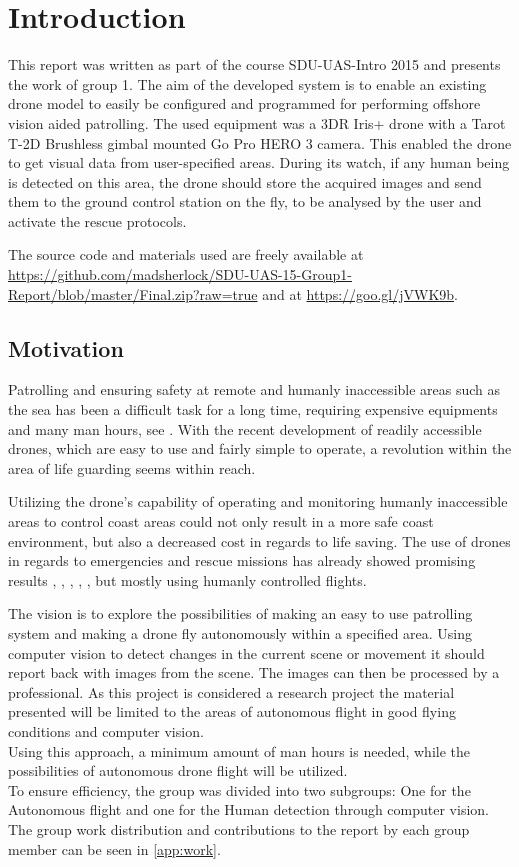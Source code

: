 \chapter*{Introduction}
This report was written as part of the course SDU-UAS-Intro 2015 and presents the work of group 1. 
The aim of the developed system is to enable an existing drone model to easily be configured and
programmed for performing offshore vision aided patrolling. 
The used equipment was a 3DR Iris+ drone with a Tarot T-2D Brushless gimbal mounted Go Pro HERO 3 camera.
This enabled the drone to get visual data from %
user-specified areas. %
During its watch, if any human being is detected on this area, the drone should store the acquired images and send
them to the ground control station on the fly, to be analysed by the user and activate the rescue protocols.

The source code and materials used are freely available at
\url{https://github.com/madsherlock/SDU-UAS-15-Group1-Report/blob/master/Final.zip?raw=true}
and at \url{https://goo.gl/jVWK9b}.

\section*{Motivation}
Patrolling and ensuring safety at remote and humanly inaccessible areas such as the sea has 
been a difficult task for a long time, requiring expensive equipments and many man hours,
see \cite{Ref:Drone2}.
With the recent development of readily accessible drones, which are easy to use and fairly simple to operate,
a revolution within the area of life guarding seems within reach. 

Utilizing the drone's capability of operating and monitoring humanly inaccessible areas to control coast areas
could not only result in a more safe coast environment, but also a decreased cost in regards to life saving.
The use of drones in regards to emergencies and rescue missions has already showed promising results
\cite{Ref:Drone1}, \cite{Ref:Drone3}, \cite{Ref:Drone4}, \cite{Ref:DroneResearch1}, \cite{Ref:DroneResearch1},
but mostly using humanly controlled flights.

The vision is to explore the possibilities of making an easy to use patrolling system
and making a drone fly autonomously within a specified area.
Using computer vision to detect changes in the current scene or movement it should report back with images from the scene.
The images can then be processed by a professional. As this project is considered a research project the material presented
will be limited to the areas of autonomous flight in good flying conditions and computer vision.
\\ 
Using this approach, a minimum amount of man hours is needed, while the possibilities of autonomous drone flight will be utilized.
\\
To ensure efficiency, the group was divided into two subgroups: One for the Autonomous flight and one for the Human detection through computer vision.
The group work distribution and contributions to the report by each group member can be seen in \ref{app:work}.

